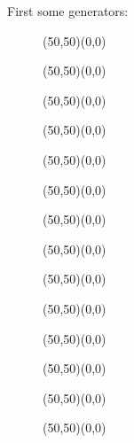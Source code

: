 	First some generators:
	\begin{figure}[H]
		\vspace{1cm}
		\begin{center}
		\begin{picture}(50,50)(0,0)
		\end{picture}
		\begin{picture}(50,50)(0,0)
		\end{picture}
		\begin{picture}(50,50)(0,0)
		\end{picture}
		\begin{picture}(50,50)(0,0)
		\end{picture}
		\begin{picture}(50,50)(0,0)
		\end{picture}
		\begin{picture}(50,50)(0,0)
		\end{picture}
		\begin{picture}(50,50)(0,0)
		\end{picture}
		\end{center}
	\end{figure}
	
	\begin{figure}[H]
		\begin{center}
		\begin{picture}(50,50)(0,0)
		\end{picture}
		\begin{picture}(50,50)(0,0)
		\end{picture}
		\begin{picture}(50,50)(0,0)
		\end{picture}
		\begin{picture}(50,50)(0,0)
		\end{picture}
		\begin{picture}(50,50)(0,0)
		\end{picture}
		\begin{picture}(50,50)(0,0)
		\end{picture}
		\begin{picture}(50,50)(0,0)
		\end{picture}
		\\[2cm]
		\end{center}
	\end{figure}
	
